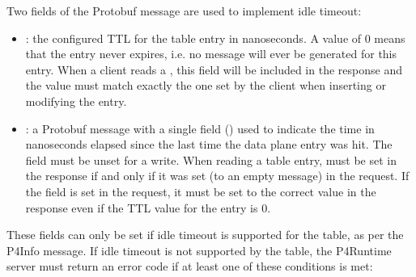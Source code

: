 \documentclass[11pt]{article}
\begin{document}
{%
Two fields of the  Protobuf message are used to implement idle
timeout:%

\begin{itemize}%

\item{}
: the configured TTL for the table entry in nanoseconds. A
value of 0 means that the entry never expires, i.e. no
 message will ever be generated for this entry. When
a client reads a , this field will be included in the response and
the value must match exactly the one set by the client when inserting or
modifying the entry.%

\item{}
: a Protobuf message with a single field ()
used to indicate the time in nanoseconds elapsed since the last time the
data plane entry was hit. The  field must be unset for a
 write. When reading a table entry,  must be
set in the response if and only if it was set (to an empty message) in the
request. If the field is set in the request, it must be set to the correct
value in the response even if the TTL value for the entry is 0.%
\end{itemize}%

\noindent{}These fields can only be set if idle timeout is supported for the table, as per
the P4Info message. If idle timeout is not supported by the table, the P4Runtime
server must return an  error code if at least one of these
conditions is met:%

}
\end{document}
